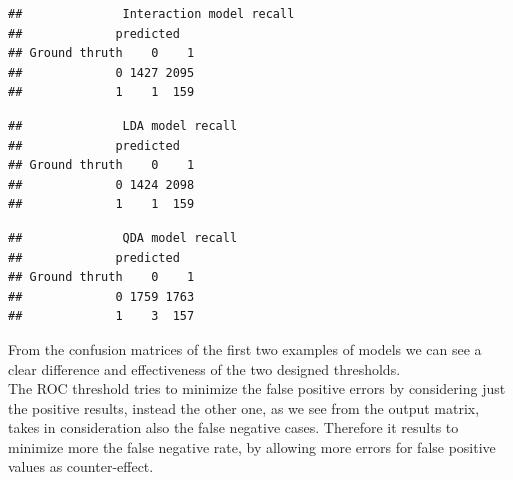 \documentclass[
]{article}
\newenvironment{Shaded}{\begin{snugshade}}{\end{snugshade}}
\newcommand{\AttributeTok}[1]{\textcolor[rgb]{0.77,0.63,0.00}{#1}}
\newcommand{\DecValTok}[1]{\textcolor[rgb]{0.00,0.00,0.81}{#1}}
\newcommand{\FunctionTok}[1]{\textcolor[rgb]{0.00,0.00,0.00}{#1}}
\newcommand{\NormalTok}[1]{#1}
\newcommand{\OtherTok}[1]{\textcolor[rgb]{0.56,0.35,0.01}{#1}}
\newcommand{\SpecialCharTok}[1]{\textcolor[rgb]{0.00,0.00,0.00}{#1}}
\newcommand{\StringTok}[1]{\textcolor[rgb]{0.31,0.60,0.02}{#1}}
\begin{document}
\begin{verbatim}
##              Interaction model recall
##             predicted
## Ground thruth    0    1
##             0 1427 2095
##             1    1  159
\end{verbatim}

\begin{Shaded}
\end{Shaded}

\begin{verbatim}
##              LDA model recall
##             predicted
## Ground thruth    0    1
##             0 1424 2098
##             1    1  159
\end{verbatim}

\begin{Shaded}
\end{Shaded}

\begin{verbatim}
##              QDA model recall
##             predicted
## Ground thruth    0    1
##             0 1759 1763
##             1    3  157
\end{verbatim}

From the confusion matrices of the first two examples of models we can
see a clear difference and effectiveness of the two designed
thresholds.\\
The ROC threshold tries to minimize the false positive errors by
considering just the positive results, instead the other one, as we see
from the output matrix, takes in consideration also the false negative
cases. Therefore it results to minimize more the false negative rate, by
allowing more errors for false positive values as counter-effect.
\end{document}
